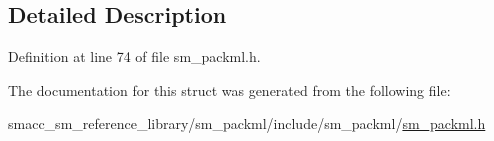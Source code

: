 \subsection{Detailed Description}


Definition at line 74 of file sm\+\_\+packml.\+h.



The documentation for this struct was generated from the following file\+:\begin{DoxyCompactItemize}
\item 
smacc\+\_\+sm\+\_\+reference\+\_\+library/sm\+\_\+packml/include/sm\+\_\+packml/\hyperlink{sm__packml_8h}{sm\+\_\+packml.\+h}\end{DoxyCompactItemize}
